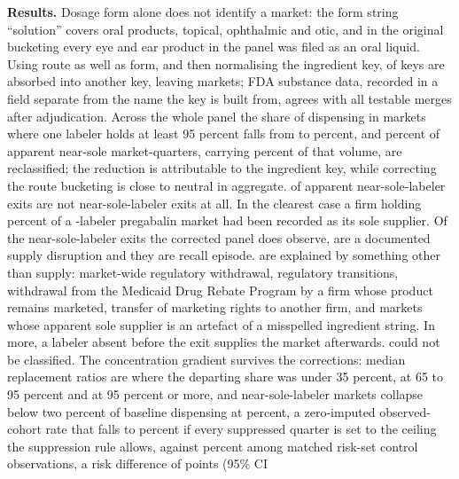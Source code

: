 \documentclass[pdflatex,sn-vancouver-num,Numbered]{sn-jnl}
\begin{document}
{\textbf{Results.} Dosage form alone does not identify a market: the form string
``solution'' covers \nSolutionOral oral products, \nSolutionTopical topical, \nSolutionOphth ophthalmic and \nSolutionOtic otic, and in
the original bucketing every eye and ear product in the panel was filed as an oral liquid. Using route as
well as form, and then normalising the ingredient key, \nKeysAbsorbed of \nRawKeys keys are
absorbed into another key, leaving \nNormKeys markets; FDA substance data, recorded in a field separate from
the name the key is built from, agrees with all \nConfirmed testable merges after adjudication. Across the whole
panel the share of dispensing in markets where one labeler holds at least 95 percent falls from
\nNearSoleVolA to \nNearSoleVolC percent, and \nReclassRate percent of apparent near-sole market-quarters, carrying \nReclassVolLargest
percent of that volume, are reclassified; the reduction is attributable to the ingredient key, while
correcting the route bucketing is close to neutral in aggregate. \nReclassSoleUC of \nRawSoleW apparent
near-sole-labeler exits are not near-sole-labeler exits at all. In the clearest case a firm holding \nPregShare percent of a \nPregLabelersW-labeler pregabalin
market had been recorded as its sole supplier. Of the \nCauseTotal near-sole-labeler exits the
corrected panel does observe, \nCauseSupplyW are a documented supply disruption and they are
\nCauseSupplyEpisodes recall episode. \nCauseExplainedUC are explained by something other than
supply: \nCauseWithdrawalW market-wide regulatory withdrawal, \nCauseTransitionW regulatory
transitions, \nCauseCoverageW withdrawal from the Medicaid Drug Rebate Program by a firm whose
product remains marketed, \nCauseTransferW transfer of marketing rights to another firm, and
\nCauseArtefactW markets whose apparent sole supplier is an artefact of a misspelled ingredient
string. In \nCauseContinuedW more, a labeler absent before the exit supplies the market
afterwards. \nCauseUndeterminedUC could not be classified. The concentration gradient survives the corrections: median
replacement ratios are \nMinorityMedian where the departing share was under 35 percent, \nHighMedian at 65 to 95
percent and \nSoleMedian at 95 percent or more, and near-sole-labeler markets collapse below two percent of
baseline dispensing at \nTreatedRate percent, a zero-imputed observed-cohort rate that falls to
\nSuppRateCeiling percent if every suppressed quarter is set to the ceiling the suppression rule
allows, against \nControlRate percent among \nControlObs matched risk-set control
observations, a risk difference of \nRiskDiff points (95\% CI \nCILo
}
\end{document}
